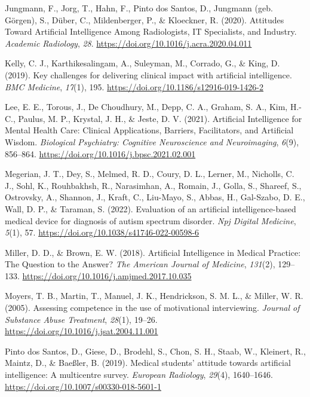 \documentclass[
  man]{apa7}
\newlength{\cslhangindent}
\newlength{\cslentryspacingunit} %
\newenvironment{CSLReferences}[2] %
 {%
  \setlength{\parindent}{0pt}
  \ifodd #1
  \let\oldpar\par
  \def\par{\hangindent=\cslhangindent\oldpar}
  \fi
  \setlength{\parskip}{#2\cslentryspacingunit}
 }%
 {}
\begin{document}
\begin{CSLReferences}{1}{0}
\leavevmode{}%
Jungmann, F., Jorg, T., Hahn, F., Pinto dos Santos, D., Jungmann (geb. Görgen), S., Düber, C., Mildenberger, P., \& Kloeckner, R. (2020). Attitudes {Toward} {Artificial} {Intelligence} {Among} {Radiologists}, {IT} {Specialists}, and {Industry}. \emph{Academic Radiology}, \emph{28}. \url{https://doi.org/10.1016/j.acra.2020.04.011}

\leavevmode{}%
Kelly, C. J., Karthikesalingam, A., Suleyman, M., Corrado, G., \& King, D. (2019). Key challenges for delivering clinical impact with artificial intelligence. \emph{BMC Medicine}, \emph{17}(1), 195. \url{https://doi.org/10.1186/s12916-019-1426-2}

\leavevmode{}%
Lee, E. E., Torous, J., De Choudhury, M., Depp, C. A., Graham, S. A., Kim, H.-C., Paulus, M. P., Krystal, J. H., \& Jeste, D. V. (2021). Artificial {Intelligence} for {Mental} {Health} {Care}: {Clinical} {Applications}, {Barriers}, {Facilitators}, and {Artificial} {Wisdom}. \emph{Biological Psychiatry: Cognitive Neuroscience and Neuroimaging}, \emph{6}(9), 856--864. \url{https://doi.org/10.1016/j.bpsc.2021.02.001}

\leavevmode{}%
Megerian, J. T., Dey, S., Melmed, R. D., Coury, D. L., Lerner, M., Nicholls, C. J., Sohl, K., Rouhbakhsh, R., Narasimhan, A., Romain, J., Golla, S., Shareef, S., Ostrovsky, A., Shannon, J., Kraft, C., Liu-Mayo, S., Abbas, H., Gal-Szabo, D. E., Wall, D. P., \& Taraman, S. (2022). Evaluation of an artificial intelligence-based medical device for diagnosis of autism spectrum disorder. \emph{Npj Digital Medicine}, \emph{5}(1), 57. \url{https://doi.org/10.1038/s41746-022-00598-6}

\leavevmode{}%
Miller, D. D., \& Brown, E. W. (2018). Artificial {Intelligence} in {Medical} {Practice}: {The} {Question} to the {Answer}? \emph{The American Journal of Medicine}, \emph{131}(2), 129--133. \url{https://doi.org/10.1016/j.amjmed.2017.10.035}

\leavevmode{}%
Moyers, T. B., Martin, T., Manuel, J. K., Hendrickson, S. M. L., \& Miller, W. R. (2005). Assessing competence in the use of motivational interviewing. \emph{Journal of Substance Abuse Treatment}, \emph{28}(1), 19--26. \url{https://doi.org/10.1016/j.jsat.2004.11.001}

\leavevmode{}%
Pinto dos Santos, D., Giese, D., Brodehl, S., Chon, S. H., Staab, W., Kleinert, R., Maintz, D., \& Baeßler, B. (2019). Medical students' attitude towards artificial intelligence: A multicentre survey. \emph{European Radiology}, \emph{29}(4), 1640--1646. \url{https://doi.org/10.1007/s00330-018-5601-1}


\end{CSLReferences}
\end{document}
